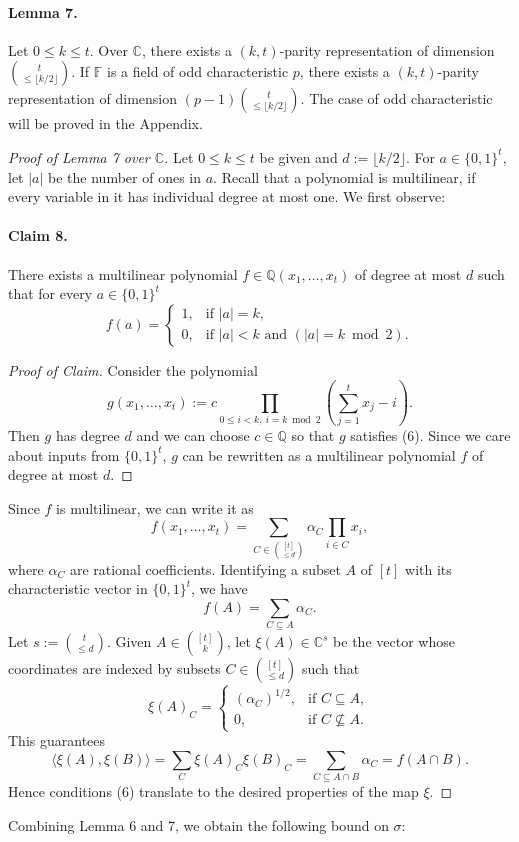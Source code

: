\paragraph{Lemma 7.} Let $0\le k\le t$. Over $\mathbb C$, there exists a $(k,t)$-parity representation of dimension $\binom t{\le\lfloor k/2\rfloor}$. If $\mathbb F$ is a field of odd characteristic $p$, there exists a $(k,t)$-parity representation of dimension $(p-1)\binom t{\le\lfloor k/2\rfloor}$.
The case of odd characteristic will be proved in the Appendix.
\begin{proof}[Proof of Lemma 7 over $\mathbb C$]
Let $0\le k\le t$ be given and $d:=\lfloor k/2\rfloor$.
For $a\in\{0,1\}^t$, let $|a|$ be the number of ones in $a$. Recall that a polynomial is multilinear, if every variable in it has individual degree at most one. We first observe:
\paragraph{Claim 8.} There exists a multilinear polynomial $f\in\mathbb Q(x_1,\ldots,x_t)$ of degree at most $d$ such that for every $a\in\{0,1\}^t$
\begin{equation}
f(a)=\begin{cases}1,&\text{if }|a|=k,\\0,&\text{if }|a|<k\text{ and }(|a|=k\bmod2).\end{cases}\tag{6}
\end{equation}
\begin{proof}[Proof of Claim]
Consider the polynomial
\[g(x_1,\ldots,x_t):=c\prod_{0\le i<k,\ i=k\bmod2}\left(\sum_{j=1}^t x_j-i\right).\]
Then $g$ has degree $d$ and we can choose $c\in\mathbb Q$ so that $g$ satisfies (6). Since we care about inputs from $\{0,1\}^t$, $g$ can be rewritten as a multilinear polynomial $f$ of degree at most $d$.
\end{proof}
Since $f$ is multilinear, we can write it as
\[f(x_1,\ldots,x_t)=\sum_{C\in\binom{[t]}{\le d}}\alpha_C\prod_{i\in C}x_i,\]
where $\alpha_C$ are rational coefficients. Identifying a subset $A$ of $[t]$ with its characteristic vector in $\{0,1\}^t$, we have
\[f(A)=\sum_{C\subseteq A}\alpha_C.\]
Let $s:=\binom t{\le d}$. Given $A\in\binom{[t]}k$, let $\xi(A)\in\mathbb C^s$ be the vector whose coordinates are indexed by subsets $C\in\binom{[t]}{\le d}$ such that
\[\xi(A)_C=\begin{cases}(\alpha_C)^{1/2},&\text{if }C\subseteq A,\\0,&\text{if }C\not\subseteq A.\end{cases}\]
This guarantees
\[\langle\xi(A),\xi(B)\rangle=\sum_C\xi(A)_C\xi(B)_C=\sum_{C\subseteq A\cap B}\alpha_C=f(A\cap B).\]
Hence conditions (6) translate to the desired properties of the map $\xi$.
\end{proof}
Combining Lemma 6 and 7, we obtain the following bound on $\sigma$:

